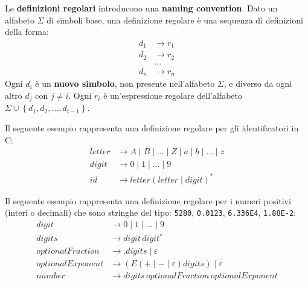 \documentclass[a4paper]{article}
\begin{document}
\vspace{1em}
\noindent
Le \textbf{definizioni regolari} introducono una \textbf{naming convention}. Dato un
alfabeto \( \Sigma  \) di simboli base, una definizione regolare è una sequenza di
definizioni della forma:
\[
  \begin{aligned}
    d_1 &\to r_1 \\
    d_2 &\to r_2 \\
        &\ldots \\
    d_n &\to r_n
  \end{aligned}
\] 
Ogni \( d_i \) è un \textbf{nuovo simbolo}, non presente nell'alfabeto \( \Sigma  \),
e diverso da ogni altro \( d_j \) con \( j \neq i \). Ogni \( r_i \) è un'espressione
regolare dell'alfabeto \( \Sigma  \cup \left\{ d_1, d_2, \ldots, d_{i-1} \right\} \).

\begin{example}
  Il seguente esempio rappresenta una definizione regolare per gli identificatori
  in C:
  \[
    \begin{aligned}
      letter &\to A \mid B \mid \ldots \mid Z \mid a \mid b \mid \ldots \mid z \\
      digit &\to 0 \mid 1 \mid \ldots \mid 9 \\
      id &\to letter ( letter \mid digit )^*
    \end{aligned}
  \] 
\end{example}

\begin{example}
  Il seguente esempio rappresenta una definizione regolare per i numeri positivi
  (interi o decimali) che sono stringhe del tipo:
  \texttt{5280}, \texttt{0.0123}, \texttt{6.336E4}, \texttt{1.88E-2}:
  \[
  \begin{aligned}
    digit &\to 0 \mid 1 \mid \ldots \mid 9 \\
    digits &\to digit \, digit^* \\
    optionalFraction &\to . digits \mid \varepsilon  \\
    optionalExponent &\to ( E ( + \mid - \mid \varepsilon  ) digits ) \mid \varepsilon  \\
    number &\to digits \, optionalFraction \, optionalExponent
  \end{aligned}
  \] 
\end{example}
\end{document}
